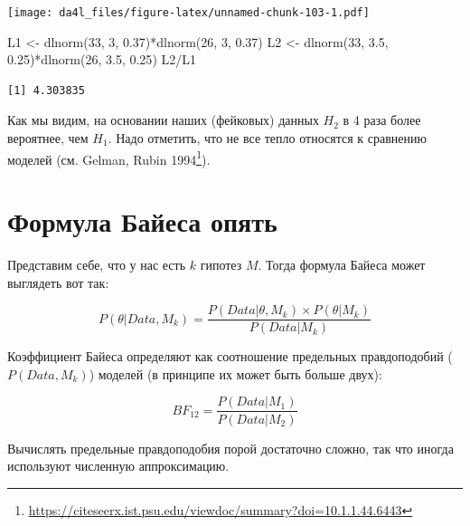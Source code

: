 \documentclass[
]{book}
\newenvironment{Shaded}{\begin{snugshade}}{\end{snugshade}}
\newcommand{\DecValTok}[1]{\textcolor[rgb]{0.00,0.00,0.81}{#1}}
\newcommand{\FloatTok}[1]{\textcolor[rgb]{0.00,0.00,0.81}{#1}}
\newcommand{\FunctionTok}[1]{\textcolor[rgb]{0.00,0.00,0.00}{#1}}
\newcommand{\NormalTok}[1]{#1}
\newcommand{\OtherTok}[1]{\textcolor[rgb]{0.56,0.35,0.01}{#1}}
\newcommand{\SpecialCharTok}[1]{\textcolor[rgb]{0.00,0.00,0.00}{#1}}
\renewcommand{\href}[2]{#2\footnote{\url{#1}}}
\begin{document}
\texttt{[image: da4l\_files/figure-latex/unnamed-chunk-103-1.pdf]}

\begin{Shaded}
\begin{Highlighting}[]
\NormalTok{L1 }\OtherTok{\textless{}{-}} \FunctionTok{dlnorm}\NormalTok{(}\DecValTok{33}\NormalTok{, }\DecValTok{3}\NormalTok{, }\FloatTok{0.37}\NormalTok{)}\SpecialCharTok{*}\FunctionTok{dlnorm}\NormalTok{(}\DecValTok{26}\NormalTok{, }\DecValTok{3}\NormalTok{, }\FloatTok{0.37}\NormalTok{)}
\NormalTok{L2 }\OtherTok{\textless{}{-}} \FunctionTok{dlnorm}\NormalTok{(}\DecValTok{33}\NormalTok{, }\FloatTok{3.5}\NormalTok{, }\FloatTok{0.25}\NormalTok{)}\SpecialCharTok{*}\FunctionTok{dlnorm}\NormalTok{(}\DecValTok{26}\NormalTok{, }\FloatTok{3.5}\NormalTok{, }\FloatTok{0.25}\NormalTok{)}
\NormalTok{L2}\SpecialCharTok{/}\NormalTok{L1}
\end{Highlighting}
\end{Shaded}

\begin{verbatim}
[1] 4.303835
\end{verbatim}

Как мы видим, на основании наших (фейковых) данных \(H_2\) в 4 раза более вероятнее, чем \(H_1\). Надо отметить, что не все тепло относятся к сравнению моделей (см. \href{https://citeseerx.ist.psu.edu/viewdoc/summary?doi=10.1.1.44.6443}{Gelman, Rubin 1994}).

\hypertarget{ux444ux43eux440ux43cux443ux43bux430-ux431ux430ux439ux435ux441ux430-ux43eux43fux44fux442ux44c}{%
\section{Формула Байеса опять}\label{ux444ux43eux440ux43cux443ux43bux430-ux431ux430ux439ux435ux441ux430-ux43eux43fux44fux442ux44c}}

Представим себе, что у нас есть \(k\) гипотез \(M\). Тогда формула Байеса может выглядеть вот так:

\[P(θ|Data, M_k) = \frac{P(Data|θ, M_k) \times  P(θ| M_k) }{P(Data|M_k)}\]

Коэффициент Байеса определяют как соотношение предельных правдоподобий (\(P(Data, M_k)\)) моделей (в принципе их может быть больше двух):

\[
BF_{12} = \frac{P(Data | M_1 )}{P(Data | M_2)}
\]

Вычислять предельные правдоподобия порой достаточно сложно, так что иногда используют численную аппроксимацию.
\end{document}
